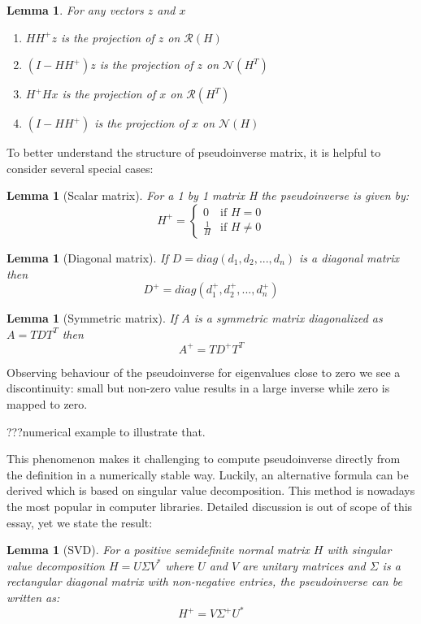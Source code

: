 \documentclass[a4paper]{article}
\theoremstyle{break}
\newtheorem{lemma}[theorem]{Lemma}
\newcommand{\bib}{???}
\newcommand{\Nu}{\mathcal{N}}
\newcommand{\Ra}{\mathcal{R}}
\begin{document}
\begin{lemma}
    For any vectors $z$ and $x$
    \begin{enumerate}
        \item $ H H^+ z $ is the projection of $z$ on $\Ra(H)$
        \item $ (I - H H^+) z $ is the projection of $z$ on $\Nu(H^T)$
        \item $ H^+ H x$ is the projection of $x$ on $ \Ra(H^T)$
        \item $ (I - H H^+) $ is the projection of $x$ on $ \Nu(H)$
    \end{enumerate}
\end{lemma}

To better understand the structure of pseudoinverse matrix, it is helpful to consider several special cases:
\begin{lemma}[Scalar matrix]
    For a 1 by 1 matrix H the pseudoinverse is given by:
    $$ H^+ = \begin{cases}
        0~~~           \text{ if } H = 0\\
        \frac{1}{H}~~ \text{ if } H \neq 0
    \end{cases}$$
\end{lemma}
\begin{lemma}[Diagonal matrix]
    If $D = diag(d_1, d_2, ..., d_n)$ is a diagonal matrix then
    $$ D^+ = diag(d_1^+, d_2^+, ..., d_n^+) $$
\end{lemma}
\begin{lemma}[Symmetric matrix]
    If $A$ is a symmetric matrix diagonalized as $A = T D T^T $ then
    $$ A^+ = T D^+ T^T$$
\end{lemma}

Observing behaviour of the pseudoinverse for eigenvalues close to zero we see a discontinuity: small but non-zero value results in a large inverse while zero is mapped to zero.

\bib numerical example to illustrate that.


This phenomenon makes it challenging to compute pseudoinverse directly from the definition in a numerically stable way. Luckily, an alternative formula can be derived which is based on singular value decomposition. This method is nowadays the most popular in computer libraries. Detailed discussion is out of scope of this essay, yet we state the result:
\begin{lemma}[SVD]
    For a positive semidefinite normal matrix $H$ with singular value decomposition $H = U \Sigma V^*$ where $U$ and $V$ are unitary matrices and $\Sigma$ is a rectangular diagonal matrix with non-negative entries, the pseudoinverse can be written as:
    $$ H^+ = V \Sigma^+ U^* $$
\end{lemma}
\end{document}
